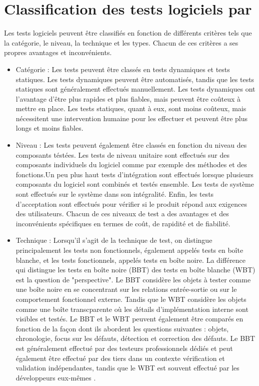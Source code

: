 \section[Classification des tests]{Classification des tests logiciels par \parencite{classification}}
\label{sec:classification}
Les tests logiciels peuvent être classifiés en fonction de différents critères tels que la catégorie, le niveau, la technique et les types. Chacun de ces critères a ses propres avantages et inconvénients.
\begin{itemize}
\item Catégorie :
Les tests peuvent être classés en tests dynamiques et tests statiques. Les tests dynamiques peuvent être automatisés, tandis que les tests statiques sont généralement effectués manuellement. Les tests dynamiques ont l'avantage d'être plus rapides et plus fiables, mais peuvent être coûteux à mettre en place. Les tests statiques, quant à eux, sont moins coûteux, mais nécessitent une intervention humaine pour les effectuer et peuvent être plus longs et moins fiables.

\item Niveau :
Les tests peuvent également être classés en fonction du niveau des composants téstées. Les tests de niveau unitaire sont effectués sur des composants individuels du logiciel comme par exemple des méthodes et des fonctions.Un peu plus haut tests d'intégration sont effectués lorsque plusieurs composants du logiciel sont combinés et testés ensemble. Les tests de système sont effectués sur le système dans son intégralité. Enfin, les tests d'acceptation sont effectués pour vérifier si le produit répond aux exigences des utilisateurs. Chacun de ces niveaux de test a des avantages et des inconvénients spécifiques en termes de coût, de rapidité et de fiabilité.

\item Technique :
Lorsqu'il s'agit de la technique de test, on distingue principalement les tests non fonctionnels, également appelés tests en boîte blanche, et les tests fonctionnels, appelés tests en boîte noire. La différence qui distingue les tests en boîte noire (BBT) des tests en boîte blanche (WBT) est la question de "perspective". Le BBT considère les objets à tester comme une boîte noire en se concentrant sur les relations entrée-sortie ou sur le comportement fonctionnel externe. Tandis que le WBT considère les objets comme une boîte transcparente où les détails d'implémentation interne sont visibles et testés. Le BBT et le WBT peuvent également être comparés en fonction de la façon dont ils abordent les questions suivantes : objets, chronologie, focus sur les défauts, détection et correction des défauts. Le BBT est généralement effectué par des testeurs professionnels dédiés et peut également être effectué par des tiers dans un contexte vérification et validation indépendantes, tandis que le WBT est souvent effectué par les développeurs eux-mêmes \parencite{SoftwareQualityEngineering}.


\end{itemize}

